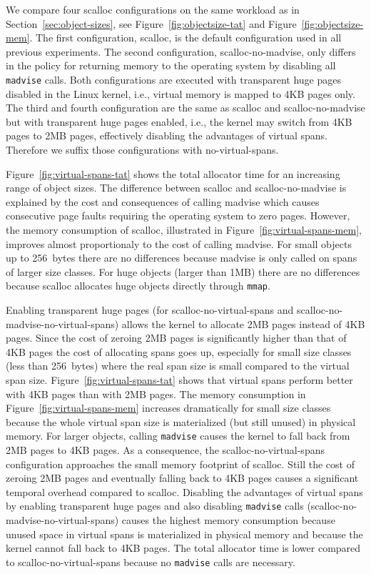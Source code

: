 \documentclass[10pt]{sigplanconf}
\newcommand{\impl}[1]{{\tt #1}\xspace}
\begin{document}
We compare four scalloc configurations on the same workload as in
Section~\ref{sec:object-sizes}, see Figure~\ref{fig:objectsize-tat} and Figure~\ref{fig:objectsize-mem}. The first configuration, scalloc, is the
default configuration used in all previous experiments.  The second
configuration, scalloc-no-madvise, only differs in the policy for returning
memory to the operating system by disabling all \impl{madvise} calls.  Both
configurations are executed with transparent huge pages disabled in the Linux
kernel, i.e., virtual memory is mapped to 4KB pages only.  The third and fourth
configuration are the same as scalloc and scalloc-no-madvise but with
transparent huge pages enabled, i.e., the kernel may switch from 4KB pages to
2MB pages, effectively disabling the advantages of virtual spans.  Therefore
we suffix those configurations with no-virtual-spans.

Figure~\ref{fig:virtual-spans-tat} shows the total allocator time for an
increasing range of object sizes.
The difference between scalloc and  scalloc-no-madvise
is explained by the cost and consequences of calling madvise which
causes consecutive page faults requiring the operating system to zero pages.
However, the memory consumption of scalloc, illustrated in 
Figure~\ref{fig:virtual-spans-mem}, improves almost proportionaly to the cost 
of calling madvise. For small objects up to 256~bytes there are no 
differences because madvise is only called on spans of larger size classes. 
For huge objects (larger than 1MB)
there are no differences because scalloc allocates 
huge objects directly through \impl{mmap}.

Enabling transparent huge pages (for scalloc-no-virtual-spans and scalloc-no-madvise-no-virtual-spans) allows the kernel to allocate 2MB pages
instead of 4KB pages. Since the cost of zeroing 2MB pages is significantly
higher than that of 4KB pages the cost of allocating spans goes up,
especially for small size classes (less than 256~bytes)
where the real span size is small compared
to the virtual span size. Figure~\ref{fig:virtual-spans-tat} shows that
virtual spans perform better with 4KB pages than with 2MB pages. The
memory consumption in Figure~\ref{fig:virtual-spans-mem} increases
dramatically for small size classes because the whole virtual span size is
materialized (but still unused) in physical memory. For larger objects,
calling \impl{madvise} causes the kernel to fall back from 2MB pages to 4KB
pages. As a consequence, the scalloc-no-virtual-spans configuration approaches
the small memory footprint of scalloc. Still the cost of zeroing 2MB pages
and eventually falling back to 4KB pages causes a significant temporal
overhead compared to scalloc. Disabling the advantages of virtual spans by
enabling transparent huge pages and also disabling \impl{madvise} calls (scalloc-no-madvise-no-virtual-spans) causes the highest memory consumption because unused space
in virtual spans is materialized in physical memory and because the kernel
cannot fall back to 4KB pages. The total allocator time is lower compared to
scalloc-no-virtual-spans because no \impl{madvise} calls are necessary.
\end{document}
